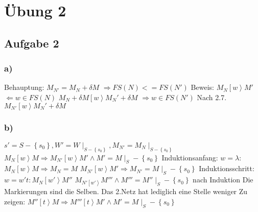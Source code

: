 \documentclass[12pt]{scrreprt}
\begin{document}
\section{Übung 2}
\subsection*{Aufgabe 2}
\subsubsection*{a)}
Behauptung:\newline
$M_{N'} = M_N + \delta M$ 	\tabto{5cm} $\Rightarrow FS(N) <= FS(N')$\newline
Beweis:\newline
$M_N \left[w\right>M'$ 	\tabto{5cm} $\Leftarrow w \in FS(N)$\newline
$M_N + \delta M \left[w\right>M_N' + \delta M$ \tabto{5cm} $\Rightarrow w \in FS(N')$\newline
Nach 2.7.\newline
$M_{N'} \left[w\right>M_N' + \delta M$

\subsubsection*{b)}
$s'=S-\left\lbrace s_0\right\rbrace, W' = W \mid _{S-\left\lbrace s_0 \right\rbrace}, M_{N'} = M_N \mid  _{S-\left\lbrace s_0\right\rbrace}$\newline
$M_N\left[w\right>M \Rightarrow M_{N'}\left[w\right>M' \wedge M' = M \mid _S-\left\lbrace s_0 \right\rbrace$\newline
Induktionsanfang:\newline
$w=\lambda:$\tabto{2cm}$M_{N} \left[w\right> M \Rightarrow M_N = M$\newline
			\tabto{2cm}$M_{N'} \left[w\right> M' \Rightarrow M_{N'} = M \mid _S-\left\lbrace s_0 \right\rbrace$\newline
Induktionsschritt:\newline
$w=w't:$\tabto{2cm}$M_N \left[w'\right>M''$\newline
		\tabto{2cm}$M_{N' \left[w'\right>}M''' \wedge M''' = M'' \mid _S-\left\lbrace s_0 \right\rbrace$ nach Induktion\newline
Die Markierungen sind die Selben. Das 2.Netz hat lediglich eine Stelle weniger\newline
Zu zeigen: \tabto{2cm} $M''\left[t\right>M \Rightarrow M'''\left[t\right>M' \wedge M' = M \mid _S-\left\lbrace s_0 \right\rbrace$
\end{document}
